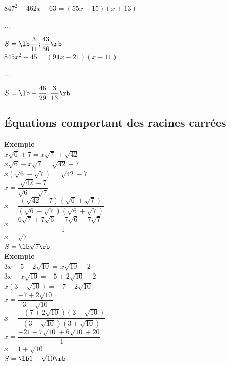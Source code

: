 $ 847^2 - 462x + 63 = \left(55x-15\right)\left(x+13\right) $

...

$ S = \lb \dfrac{3}{11} ; \dfrac{43}{36} \rb $ \\

$ 845x^2 - 45 = \left(91x-21\right)\left(x-11\right) $

...

$ S = \lb -\dfrac{46}{29} ; \dfrac{3}{13} \rb $

\newpage

\subsection{Équations comportant des racines carrées}

\begin{minipage}{.5\textwidth}
\textbf{Exemple }\\

$ x\sqrt{6} + 7 = x\sqrt{7} + \sqrt{42} $\\

$ x\sqrt{6} - x\sqrt{7} = \sqrt{42} - 7 $\\

$ x \left(\sqrt{6} - \sqrt{7}\right) = \sqrt{42} - 7 $ \\

$ x = \dfrac{\sqrt{42}-7}{\sqrt{6} - \sqrt{7}} $ \\

$ x = \dfrac{\left(\sqrt{42}-7\right)\left(\sqrt{6}+\sqrt{7}\right)}{\left(\sqrt{6} - \sqrt{7}\right)\left(\sqrt{6}+\sqrt{7}\right)} $ \\

$ x = \dfrac{6\sqrt{7}+7\sqrt{6}-7\sqrt{6}-7\sqrt{7}}{-1} $\\ 

$ x = \sqrt{7} $ \\

$ S = \lb \sqrt{7} \rb $ \\

\vspace{.5cm}
\textbf{Exemple }\\

$ 3x + 5 -2\sqrt{10} = x\sqrt{10} - 2 $\\ 

$ 3x - x\sqrt{10} = -5 + 2\sqrt{10} -2 $\\

$ x\left(3-\sqrt{10}\right) = -7 + 2\sqrt{10} $ \\

$ x = \dfrac{-7+2\sqrt{10}}{3-\sqrt{10}} $ \\

$ x =  \dfrac{-\left(7+2\sqrt{10}\right)\left(3+\sqrt{10}\right)}{\left(3-\sqrt{10}\right)\left(3+\sqrt{10}\right)} $ \\

$ x = \dfrac{-21-7\sqrt{10}+6\sqrt{10}+20}{-1} $\\

$ x = 1 + \sqrt{10} $ \\

$ S = \lb 1+\sqrt{10} \rb $ \\
\end{minipage}
